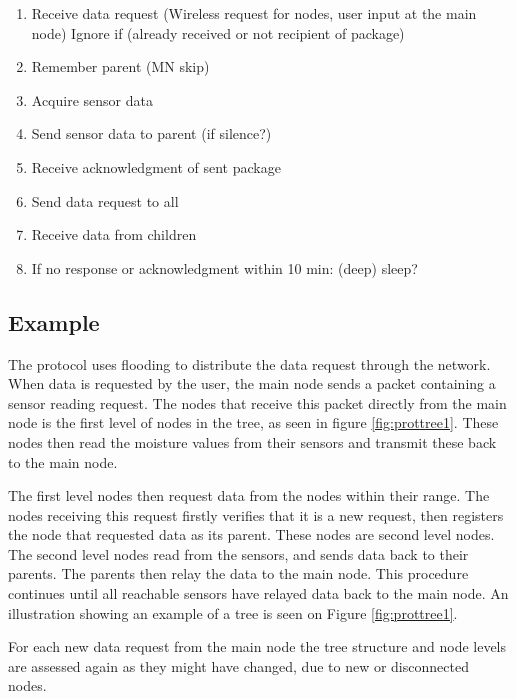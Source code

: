 \begin{enumerate}
	\item Receive data request (Wireless request for nodes, user input at the main node)
		\subitem Ignore if (already received or not recipient of package)
	\item Remember parent (MN skip)
	\item Acquire sensor data
	\item Send sensor data to parent (if silence?)
	\item Receive acknowledgment of sent package
	\item Send data request to all
	\item Receive data from children
	\item If no response or acknowledgment within 10 min: (deep) sleep?
\end{enumerate}



\subsection*{Example}
The protocol uses flooding to distribute the data request through the network. 
When data is requested by the user, the main node sends a packet containing a sensor reading request. 
The nodes that receive this packet directly from the main node is the first level of nodes in the tree, as seen in figure \ref{fig:prottree1}. 
These nodes then read the moisture values from their sensors and transmit these back to the main node. 

The first level nodes then request data from the nodes within their range. 
The nodes receiving this request firstly verifies that it is a new request, then registers the node that requested data as its parent. 
These nodes are second level nodes. The second level nodes read from the sensors, and sends data back to their parents. The parents then relay the data to the main node. 
This procedure continues until all reachable sensors have relayed data back to the main node.
An illustration showing an example of a tree is seen on Figure \ref{fig:prottree1}.

For each new data request from the main node the tree structure and node levels are assessed again as they might have changed, due to new or disconnected nodes.

